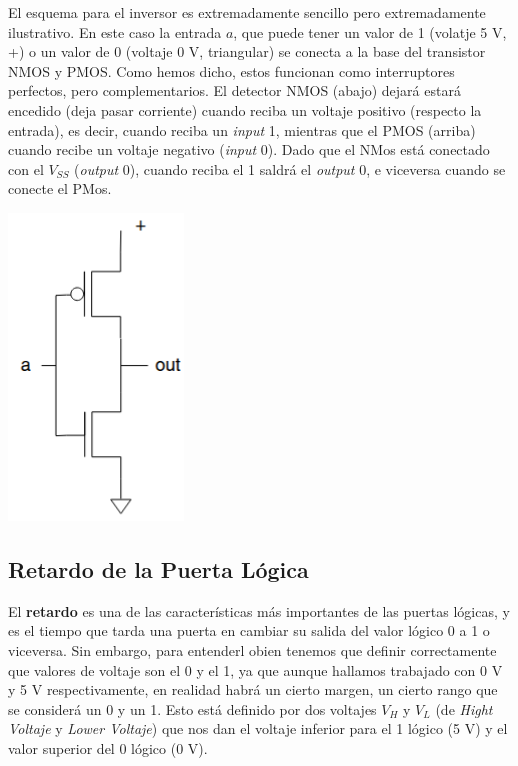 \begin{minipage}{0.65\linewidth}
El esquema para el inversor es extremadamente sencillo pero extremadamente ilustrativo. En este caso la entrada $a$, que puede tener un valor de 1 (volatje 5 V, +) o un valor de 0 (voltaje 0 V, triangular) se conecta a la base del transistor NMOS y PMOS. Como hemos dicho, estos funcionan como interruptores perfectos, pero complementarios. El detector NMOS (abajo) dejará estará encedido (deja pasar corriente) cuando reciba un voltaje positivo (respecto la entrada), es decir, cuando reciba un \textit{input} 1, mientras que el PMOS (arriba) cuando recibe un voltaje negativo (\textit{input} 0). Dado que el NMos está conectado con el $V_{SS}$ (\textit{output} 0), cuando reciba el 1 saldrá el \textit{output} 0, e viceversa cuando se conecte el PMos. 
\end{minipage}
\hfill
\begin{minipage}{0.32\linewidth} \centering
    \includegraphics[width=0.5\linewidth]{Imagenes/02-Inversor.png}
    \label{Fig:02-Inversora}
\end{minipage}

\subsection{Retardo de la Puerta Lógica}

El \textbf{retardo} es una de las características más importantes de las puertas lógicas, y es el tiempo que tarda una puerta en cambiar su salida del valor lógico 0 a 1 o viceversa. Sin embargo, para entenderl obien tenemos que definir correctamente que valores de voltaje son el 0 y el 1, ya que aunque hallamos trabajado con 0 V y 5 V respectivamente, en realidad habrá un cierto margen, un cierto rango que se considerá un 0 y un 1. Esto está definido por dos voltajes $V_H$ y $V_L$ (de \textit{Hight Voltaje} y \textit{Lower Voltaje}) que nos dan el voltaje inferior para el 1 lógico (5 V) y el valor superior del 0 lógico (0 V).

